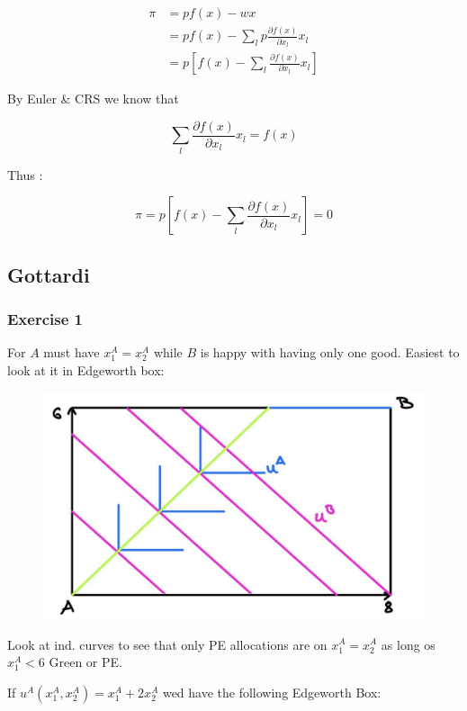 {\begin{enumerate}[label=(\alph*)]
{$$
\begin{aligned}
\pi & =p f(x)-w x \\
& =p f(x)-\sum_{l} p \frac{\partial f(x)}{\partial x_{l}} x_{l} \\
& =p\left[f(x)-\sum_{l} \frac{\partial f(x)}{\partial x_{l}} x_{l}\right]
\end{aligned}
$$

By Euler \& CRS we know that

$$
\sum_{l} \frac{\partial f(x)}{\partial x_{l}} x_{l}=f(x)
$$

Thus :

$$
\pi=p\left[f(x)-\sum_{l} \frac{\partial f(x)}{\partial x_{l}} x_{l}\right]=0
$$
}
\end{enumerate}
}
\newpage
{
\subsection*{Gottardi}

\subsubsection*{Exercise 1}

\begin{enumerate}[label=(\alph*)]
{\item 
For $A$ must have $x_{1}^{A}=x_{2}^{A}$ while $B$ is happy with having only one good. Easiest to look at it in Edgeworth box:

\begin{figure}[!htp]
    \centering
    \includegraphics[width=.75\textwidth]{images/2016_17_1_1.png}
\end{figure}

Look at ind. curves to see that only PE allocations are on $x_{1}^{A}=x_{2}^{A}$ as long os $x_{1}^{A}<6$ Green or PE.

If $u^{A}\left(x_{1}^{A}, x_{2}^{A}\right)=x_{1}^{A}+2 x_{2}^{A}$ wed have the following Edgeworth Box:

}
\end{enumerate}}
